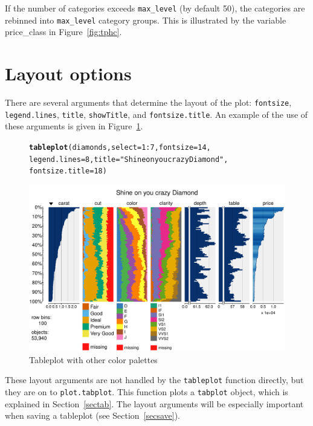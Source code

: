 \documentclass[11pt, fleqn, a4paper]{article}\usepackage{graphicx, color}
\makeatletter
\def\maxwidth{ %
  \ifdim\Gin@nat@width>\linewidth
    \linewidth
  \else
    \Gin@nat@width
  \fi
}
\newcommand{\hlfunctioncall}[1]{\textcolor[rgb]{0.501960784313725,0,0.329411764705882}{\textbf{#1}}}%
\newcommand{\hlstring}[1]{\textcolor[rgb]{0.6,0.6,1}{#1}}%
\newenvironment{kframe}{%
 \def\at@end@of@kframe{}%
 \ifinner\ifhmode%
  \def\at@end@of@kframe{\end{minipage}}%
  \begin{minipage}{\columnwidth}%
 \fi\fi%
 \def\FrameCommand##1{\hskip\@totalleftmargin \hskip-\fboxsep
 \colorbox{shadecolor}{##1}\hskip-\fboxsep
     \hskip-\linewidth \hskip-\@totalleftmargin \hskip\columnwidth}%
 \MakeFramed {\advance\hsize-\width
   \@totalleftmargin\z@ \linewidth\hsize
   \@setminipage}}%
 {\par\unskip\endMakeFramed%
 \at@end@of@kframe}
\newenvironment{knitrout}{}{} %
\makeatother
\begin{document}
If the number of categories exceeds {\tt max\_level} (by default 50), the categories are rebinned into {\tt max\_level} category groups. This is illustrated by the variable price\_class in Figure~\ref{fig:tphc}.


\section{Layout options}
There are several arguments that determine the layout of the plot:
{\tt fontsize}, {\tt legend.lines}, {\tt title}, {\tt showTitle}, and {\tt fontsize.title}. An example of the use of these arguments is given in Figure~\ref{fig:tp6}.

\begin{figure}[htp]
\begin{knitrout}
\color{fgcolor}\begin{kframe}
\begin{alltt}
\hlfunctioncall{tableplot}(diamonds, select = 1:7, fontsize = 14, 
    legend.lines = 8, title = \hlstring{"Shine on you crazy Diamond"}, 
    fontsize.title = 18)
\end{alltt}
\end{kframe}
\includegraphics[width=\maxwidth]{figure/chunk10} 

\end{knitrout}

\caption{Tableplot with other color palettes}
\label{fig:tp6}
\end{figure}

These layout arguments are not handled by the {\tt tableplot} function directly, but they are on to {\tt plot.tabplot}. This function plots a {\tt tabplot} object, which is explained in Section~\ref{sectab}. The layout arguments will be especially important when saving a tableplot (see Section~\ref{secsave}).
\end{document}
